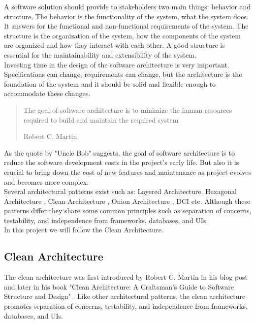\begin{spacing}{1.2}
    A software solution should provide to stakeholders two main things: behavior and structure.
    The behavior is the functionality of the system, what the system does. It answers for the functional and non-functional requirements of the system.
    The structure is the organization of the system, how the components of the system are organized and how they interact with each other.
    A good structure is essential for the maintainability and extensibility of the system.
    \\

    Investing time in the design of the software architecture is very important. Specifications can change, requirements can change, but the architecture is the foundation of the system and
    it should be solid and flexible enough to accommodate these changes.
    \begin{quote}
        The goal of software architecture is to minimize the human resources required to build and maintain the required system
        \begin{flushright}
            Robert C. Martin \cite{clean}
        \end{flushright}

    \end{quote}

    As the quote by "Uncle Bob" suggests, the goal of software architecture is to reduce the software development costs in the project's early life. But also it is
    crucial to bring down the cost of new features and maintenance as project evolves and becomes more complex.
    \\

    Several architectural patterns exist such as: Layered Architecture, Hexagonal Architecture \cite{freeman2009growing}, Clean Architecture \cite{clean}, Onion Architecture \cite{Onion}, DCI \cite{dci} etc.
    Although these patterns differ they share some common principles such as separation of concerns, testability, and independence from frameworks, databases, and UIs.
    \\

    In this project we will follow the Clean Architecture.


    \subsection{Clean Architecture}
    The clean architecture was first introduced by Robert C. Martin 
    in his blog post \cite{cleanBlog} and later in his book "Clean Architecture: A Craftsman's Guide to Software Structure and
    Design" \cite{clean}. Like other architectural patterns, the clean architecture promotes
    separation of concerns, testability, and independence from frameworks, databases, and UIs.


\end{spacing}
